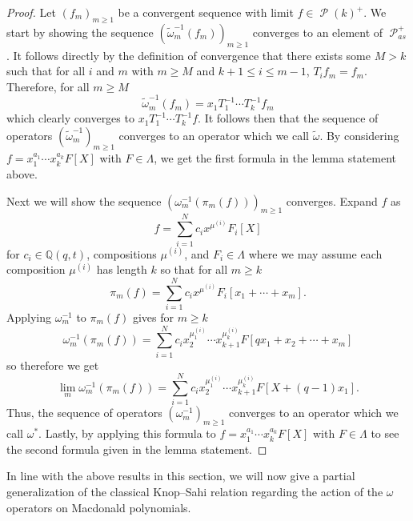 \documentclass[ALCO,Unicode]{cedram}
\DeclareMathOperator{\sP}{\mathscr{P} }
\begin{document}
\begin{proof}
    Let $(f_m)_{m\geq 1}$ be a convergent sequence with limit $f \in \sP(k)^{+}$. We start by showing the sequence $(\widetilde{\omega}_m^{-1}(f_m))_{m \geq 1}$ converges to an element of $\sP_{as}^{+}$. It follows directly by the definition of convergence that there exists some $M >k$ such that for all $i$ and $m$ with $m \geq M$ and $k+1 \leq i \leq m-1$, $T_if_m = f_m$. Therefore, for all $m \geq M$ 
    $$\widetilde{\omega}_m^{-1}(f_m) = x_1T_1^{-1}\cdots T_{k}^{-1}f_m $$ 
    which clearly converges to $x_1T_1^{-1}\cdots T_{k}^{-1}f$. It follows then that the sequence of operators $(\widetilde{\omega}_m^{-1})_{m\geq 1}$ converges to an operator which we call $\widetilde{\omega}.$ By considering $f = x_1^{a_1}\cdots x_k^{a_k}F[X]$ with $F \in \Lambda$, we get the first formula 
    in the lemma statement above.

    Next we will show the sequence $(\omega^{-1}_m(\pi_m(f)))_{m \geq 1}$ converges.
    Expand $f$ as
    $$f = \sum_{i=1}^{N} c_ix^{\mu^{(i)}}F_i[X]$$
    for $c_i \in \mathbb{Q}(q,t)$, compositions $\mu^{(i)}$, and $F_i \in \Lambda$ where we may assume each composition $\mu^{(i)}$ has length $k$ so that for all $m \geq k$ 
    $$ \pi_m(f) = \sum_{i=1}^{N} c_i x^{\mu^{(i)}} F_i[x_1+\cdots + x_m].$$
    Applying $\omega_{m}^{-1}$ to $\pi_m(f)$ gives for $m \geq k$ 
    $$\omega_{m}^{-1}(\pi_m(f)) = \sum_{i=1}^{N} c_i x_2^{\mu^{(i)}_1}\cdots x_{k+1}^{\mu^{(i)}_k}F[qx_1+x_2+\cdots + x_m] $$
    so therefore we get 
    $$\lim_{m} \omega_{m}^{-1}(\pi_m(f)) = \sum_{i=1}^{N} c_i x_2^{\mu^{(i)}_1}\cdots x_{k+1}^{\mu^{(i)}_k}F[X+(q-1)x_1].$$
    Thus, the sequence of operators $(\omega_{m}^{-1})_{m \geq 1}$ converges to an operator which we call $\omega^{*}$. Lastly, by applying this formula to $f = x_1^{a_1}\cdots x_k^{a_k}F[X]$ with $F \in \Lambda$ to see the second formula given in the lemma statement.
\end{proof}

In line with the above results in this section, we will now give a partial generalization of the classical Knop--Sahi relation regarding the action of the $\omega$ operators on Macdonald polynomials.  
\end{document}
